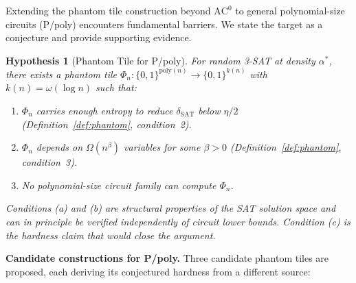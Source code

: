\documentclass[11pt]{article}
\newtheorem{hypothesis}[lemma]{Hypothesis}
\theoremstyle{definition}
\begin{document}
Extending the phantom tile construction beyond $\mathrm{AC}^0$ to general
polynomial-size circuits ($\mathrm{P/poly}$) encounters fundamental barriers.
We state the target as a conjecture and provide supporting evidence.

\begin{hypothesis}[Phantom Tile for P/poly]
\label{hyp:PT-Ppoly}
For random 3-SAT at density $\alpha^*$, there exists a phantom tile
$\Phi_n : \{0,1\}^{\mathrm{poly}(n)} \to \{0,1\}^{k(n)}$ with $k(n) = \omega(\log n)$
such that:
\begin{enumerate}
  \item[\textup{(a)}] $\Phi_n$ carries enough entropy to reduce $\delta_{\mathrm{SAT}}$ below $\eta/2$
    (Definition~\ref{def:phantom}, condition~2).
  \item[\textup{(b)}] $\Phi_n$ depends on $\Omega(n^\beta)$ variables for some $\beta > 0$
    (Definition~\ref{def:phantom}, condition~3).
  \item[\textup{(c)}] No polynomial-size circuit family can compute $\Phi_n$.
\end{enumerate}
Conditions (a) and (b) are structural properties of the SAT solution space and can
in principle be verified independently of circuit lower bounds.
Condition (c) is the hardness claim that would close the argument.
\end{hypothesis}

\noindent\textbf{Candidate constructions for P/poly.}
Three candidate phantom tiles are proposed, each deriving its conjectured hardness
from a different source:
\end{document}
